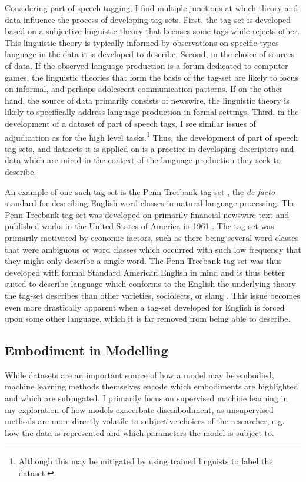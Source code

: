 {Considering part of speech tagging, I find multiple junctions at which theory and data influence the process of developing tag-sets.
First, the tag-set is developed based on a subjective linguistic theory that licenses some tags while rejects other.
This linguistic theory is typically informed by observations on specific types language in the data it is developed to describe.
Second, in the choice of sources of data.
If the observed language production is a forum dedicated to computer games, the linguistic theories that form the basis of the tag-set are likely to focus on informal, and perhaps adolescent communication patterns.
If on the other hand, the source of data primarily consists of newswire, the linguistic theory is likely to specifically address language production in formal settings.
Third, in the development of a dataset of part of speech tags, I see similar issues of adjudication as for the high level tasks.\footnote{Although this may be mitigated by using trained linguists to label the dataset.}
Thus, the development of part of speech tag-sets, and datasets it is applied on is a practice in developing descriptors and data which are mired in the context of the language production they seek to describe.

An example of one such tag-set is the Penn Treebank tag-set \citep{Marcus:1993}, the \textit{de-facto} standard for describing English word classes in natural language processing.
The Penn Treebank tag-set was developed on primarily financial newswire text and published works in the United States of America in 1961 \citep{Francis:1982}.
The tag-set was primarily motivated by economic factors, such as there being several word classes that were ambiguous or word classes which occurred with such low frequency that they might only describe a single word.
The Penn Treebank tag-set was thus developed with formal Standard American English in mind and is thus better suited to describe language which conforms to the English the underlying theory the tag-set describes than other varieties, sociolects, or slang \citep{Blodgett:2016,Jorgensen:2016}.
This issue becomes even more drastically apparent when a tag-set developed for English is forced upon some other language, which it is far removed from being able to describe.

\subsection{Embodiment in Modelling}\label{sec:model_embodiments}
While datasets are an important source of how a model may be embodied, machine learning methods themselves encode which embodiments are highlighted and which are subjugated.
I primarily focus on supervised machine learning in my exploration of how models exacerbate disembodiment, as unsupervised methods are more directly volatile to subjective choices of the researcher, e.g. how the data is represented and which parameters the model is subject to.

}
